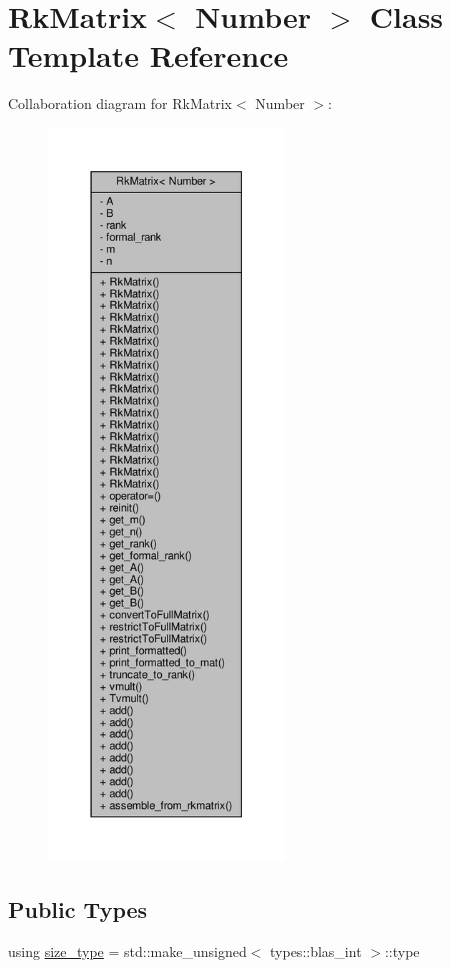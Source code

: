 \hypertarget{classRkMatrix}{}\section{Rk\+Matrix$<$ Number $>$ Class Template Reference}
\label{classRkMatrix}


Collaboration diagram for Rk\+Matrix$<$ Number $>$\+:\nopagebreak
\begin{figure}[H]
\begin{center}
\leavevmode
\includegraphics[height=550pt]{classRkMatrix__coll__graph}
\end{center}
\end{figure}
\subsection*{Public Types}
\begin{DoxyCompactItemize}
\item 
using \hyperlink{classRkMatrix_add060bfc3a4cc77f858c3d6dd58cadd5}{size\+\_\+type} = std\+::make\+\_\+unsigned$<$ types\+::blas\+\_\+int $>$\+::type
\end{DoxyCompactItemize}
